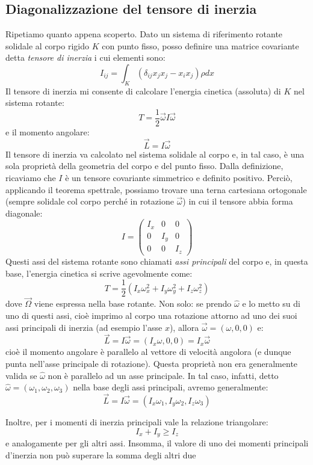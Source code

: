\documentclass[a4paper,openany]{article}
\begin{document}
	\subsection{Diagonalizzazione del tensore di inerzia}
	Ripetiamo quanto appena scoperto. Dato un sistema di riferimento rotante solidale al corpo rigido $K$ con punto fisso, posso definire una matrice covariante detta \textit{tensore di inerzia} i cui elementi sono:
	$$
	I_{ij} = \int_{K}(\delta_{ij}x_j x_j - x_i x_j)\rho dx
	$$
	Il tensore di inerzia mi consente di calcolare l'energia cinetica (assoluta) di $K$ nel sistema rotante:
	$$
	T = \dfrac{1}{2}\vec{\omega}I\vec{\omega}
	$$
	e il momento angolare:
	$$
	\vec{L} = I\vec{\omega}
	$$
	Il tensore di inerzia va calcolato nel sistema solidale al corpo e, in tal caso, è una sola proprietà della geometria del corpo e del punto fisso.
	Dalla definizione, ricaviamo che $I$ è un tensore covariante simmetrico e definito positivo. Perciò, applicando il teorema spettrale, possiamo trovare una terna cartesiana ortogonale (sempre solidale col corpo perché in rotazione $\vec{\omega}$) in cui il tensore abbia forma diagonale:
	\begin{equation}\label{key}
		I =
		\begin{pmatrix}
			I_{x} & 0 & 0 \\
			0 & I_{y} & 0 \\
			0 & 0 & I_{z} 
		\end{pmatrix}
	\end{equation}
	Questi assi del sistema rotante sono chiamati \textit{assi principali} del corpo e, in questa base, l'energia cinetica si scrive agevolmente come:
	$$
	T = \dfrac{1}{2}(I_{x}\omega_{x}^{2}+I_{y}\omega_{y}^{2}+I_{z}\omega_{z}^{2})
	$$ 
	dove $\vec{\Omega}$ viene espressa nella base rotante. Non solo: se prendo $\hat{\omega}$ e lo metto su di uno di questi assi, cioè imprimo al corpo una rotazione attorno ad uno dei suoi assi principali di inerzia (ad esempio l'asse $x$), allora $\vec{\omega} = (\omega,0,0)$ e:
	$$
	\vec{L} = I\vec{\omega} = (I_{x}\omega,0,0) = I_{x}\vec\omega
	$$
	cioè il momento angolare è parallelo al vettore di velocità angolora (e dunque punta nell'asse principale di rotazione). Questa proprietà non era generalmente valida se $\hat{\omega}$ non è parallelo ad un asse principale. In tal caso, infatti, detto $\hat{\omega} = (\omega_1, \omega_2, \omega_3)$ nella base degli assi principali, avremo generalmente:
	$$
	\vec{L} = I\vec{\omega} = (I_{x}\omega_1,I_y \omega_2, I_z \omega_3)
	$$
	
	Inoltre, per i momenti di inerzia principali vale la relazione triangolare:
	$$
	I_x+I_y \geq I_z
	$$
	e analogamente per gli altri assi. Insomma, il valore di uno dei momenti principali d'inerzia non può superare la somma degli altri due
\end{document}
